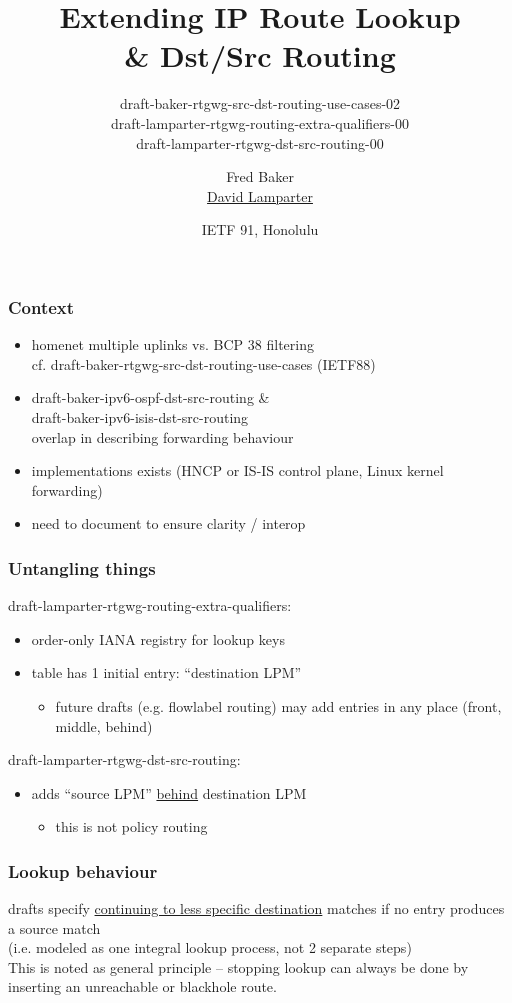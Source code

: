 \documentclass[14pt]{beamer}
\title{Extending IP Route Lookup \\ \& Dst/Src Routing}
\subtitle{%
  draft-baker-rtgwg-src-dst-routing-use-cases-02\\%
  draft-lamparter-rtgwg-routing-extra-qualifiers-00\\%
  draft-lamparter-rtgwg-dst-src-routing-00%
}
\author{%
  Fred Baker\\%
  \underline{David Lamparter}%
}
\date{IETF 91, Honolulu}
\begin{document}
\begin{frame}
  \titlepage
\end{frame}

\begin{frame}
  \frametitle{Context}
  \begin{itemize}
  \item homenet multiple uplinks vs. BCP 38 filtering\\%
    cf. draft-baker-rtgwg-src-dst-routing-use-cases (IETF88)
  \item draft-baker-ipv6-ospf-dst-src-routing \&\\%
    draft-baker-ipv6-isis-dst-src-routing\\%
    overlap in describing forwarding behaviour
  \item implementations exists
    (HNCP or IS-IS control plane, Linux kernel forwarding)
  \item need to document to ensure clarity / interop
  \end{itemize}
\end{frame}

\begin{frame}
  \frametitle{Untangling things}
  draft-lamparter-rtgwg-routing-extra-qualifiers:
  \begin{itemize}
    \item order-only IANA registry for lookup keys
    \item table has 1 initial entry: ``destination LPM''
    \begin{itemize}
      \item future drafts (e.g. flowlabel routing) may add entries in any place
        (front, middle, behind)
    \end{itemize}
  \end{itemize}
  draft-lamparter-rtgwg-dst-src-routing:
  \begin{itemize}
    \item adds ``source LPM'' \underline{behind} destination LPM
    \begin{itemize}
      \item this is not policy routing
    \end{itemize}
  \end{itemize}
\end{frame}

\begin{frame}
\frametitle{Lookup behaviour}
drafts specify \underline{\color{red}continuing to less specific destination} matches
if no entry produces a source match\\
(i.e. modeled as one integral lookup process, not 2 separate steps)\\[1cm]
This is noted as general principle -- stopping lookup can always be done
by inserting an unreachable or blackhole route.
\end{frame}
\end{document}
